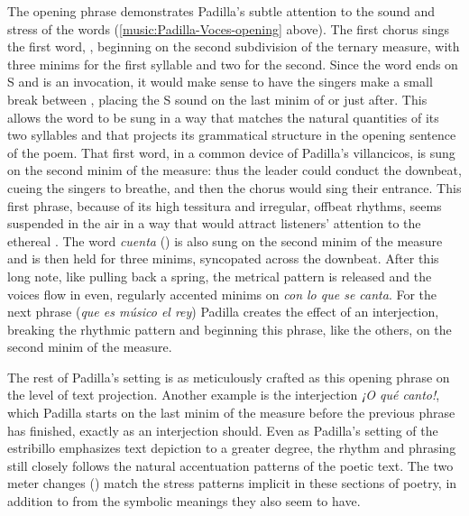 The opening phrase demonstrates Padilla's subtle attention to the sound and
stress of the words (\cref{music:Padilla-Voces-opening} above).
The first chorus sings the first word, , beginning on the second
subdivision of the ternary measure, with three minims for the first syllable and
two for the second.
Since the word ends on S and is an invocation, it would make sense to have the
singers make a small break between , placing the S sound on the
last minim of  or just after.
This allows the word to be sung in a way that matches the natural quantities of
its two syllables and that projects its grammatical structure in the opening
sentence of the poem.
That first word, in a common device of Padilla's villancicos, is sung on the
second minim of the measure: thus the leader could conduct the downbeat, cueing
the singers to breathe, and then the chorus would sing their entrance. 
This first phrase, because of its high tessitura and irregular, offbeat rhythms,
seems suspended in the air in a way that would attract listeners' attention to
the ethereal . 
The word \emph{cuenta} () is also sung on the second minim of the
measure and is then held for three minims, syncopated across the downbeat.
After this long note, like pulling back a spring, the metrical pattern is
released and the voices flow in even, regularly accented minims on \emph{con lo
que se canta}.
For the next phrase (\emph{que es músico el rey}) Padilla creates the effect of
an interjection, breaking the rhythmic pattern and beginning this phrase, like
the others, on the second minim of the measure.

The rest of Padilla's setting is as meticulously crafted as this opening phrase
on the level of text projection.
Another example is the interjection \emph{¡O qué canto!}, which Padilla starts
on the last minim of the measure before the previous phrase has finished,
exactly as an interjection should.
Even as Padilla's setting of the estribillo emphasizes text depiction to a
greater degree, the rhythm and phrasing still closely follows the natural
accentuation patterns of the poetic text.
The two meter changes () match the stress patterns implicit
in these sections of poetry, in addition to from the symbolic meanings they also
seem to have.

\endinput
\subsection{Depicting the Words}

